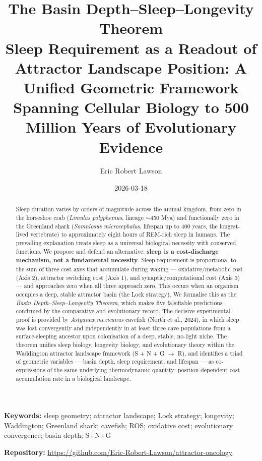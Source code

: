 \documentclass[12pt, a4paper]{article}
\title{
    \textbf{The Basin Depth--Sleep--Longevity Theorem} \\[0.5em]
    \large Sleep Requirement as a Readout of Attractor Landscape
    Position: A Unified Geometric Framework Spanning
    Cellular Biology to 500 Million Years of
    Evolutionary Evidence
}
\author[1]{Eric Robert Lawson}
\affil[1]{OrganismCore, Independent Research}
\date{2026-03-18}
\begin{document}

\maketitle

\begin{abstract}
Sleep duration varies by orders of magnitude across the animal
kingdom, from zero in the horseshoe crab (\textit{Limulus
polyphemus}, lineage $\sim$450 Mya) and functionally zero in
the Greenland shark (\textit{Somniosus microcephalus},
lifespan up to 400 years, the longest-lived vertebrate) to
approximately eight hours of REM-rich sleep in humans. The
prevailing explanation treats sleep as a universal biological
necessity with conserved functions. We propose and defend an
alternative: \textbf{sleep is a cost-discharge mechanism,
not a fundamental necessity}. Sleep requirement is
proportional to the sum of three cost axes that accumulate
during waking --- oxidative/metabolic cost (Axis 2), attractor
switching cost (Axis 1), and synaptic/computational cost
(Axis 3) --- and approaches zero when all three approach zero.
This occurs when an organism occupies a deep, stable attractor
basin (the Lock strategy). We formalise this as the
\textit{Basin Depth--Sleep--Longevity Theorem}, which makes
five falsifiable predictions confirmed by the comparative and
evolutionary record. The decisive experimental proof is
provided by \textit{Astyanax mexicanus} cavefish (North et
al., 2024), in which sleep was lost convergently and
independently in at least three cave populations from a
surface-sleeping ancestor upon colonisation of a deep, stable,
no-light niche. The theorem unifies sleep biology, longevity
biology, and evolutionary theory within the Waddington
attractor landscape framework (S + N + G $\rightarrow$ R),
and identifies a triad of geometric variables --- basin depth,
sleep requirement, and lifespan --- as co-expressions of the
same underlying thermodynamic quantity: position-dependent
cost accumulation rate in a biological landscape.
\end{abstract}

\bigskip
\noindent\textbf{Keywords:} sleep geometry; attractor landscape;
Lock strategy; longevity; Waddington; Greenland shark;
cavefish; ROS; oxidative cost; evolutionary convergence;
basin depth; S+N+G

\bigskip
\noindent\textbf{Repository:}
\url{https://github.com/Eric-Robert-Lawson/attractor-oncology}
\end{document}
